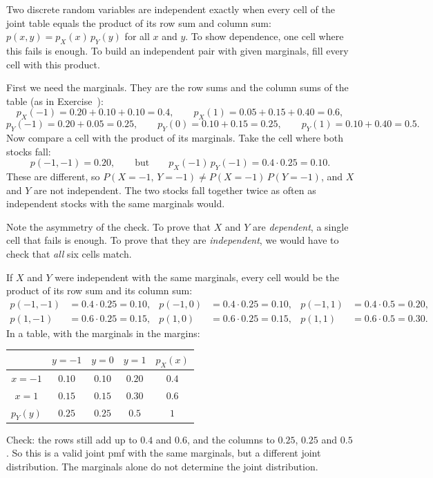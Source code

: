 \begin{solution}
	\idea Two discrete random variables are independent exactly when every
	cell of the joint table equals the product of its row sum and column sum:
	$p(x,y)=p_X(x)\,p_Y(y)$ for all $x$ and $y$. To show dependence, one cell
	where this fails is enough. To build an independent pair with given
	marginals, fill every cell with this product.

	 First we need the marginals. They are the row sums and the
	column sums of the table (as in Exercise~):
	\[ p_X(-1)=0.20+0.10+0.10=0.4,\qquad p_X(1)=0.05+0.15+0.40=0.6, \]
	\[ p_Y(-1)=0.20+0.05=0.25,\qquad p_Y(0)=0.10+0.15=0.25,\qquad
		p_Y(1)=0.10+0.40=0.5. \]
	Now compare a cell with the product of its marginals. Take the cell where
	both stocks fall:
	\[ p(-1,-1)=0.20,\qquad\text{but}\qquad
		p_X(-1)\,p_Y(-1)=0.4\cdot0.25=0.10. \]
	These are different, so $P(X=-1,\,Y=-1)\neq P(X=-1)\,P(Y=-1)$, and $X$
	and $Y$ are not independent. The two stocks fall together twice as often
	as independent stocks with the same marginals would.

	Note the asymmetry of the check. To prove that $X$ and $Y$ are
	\emph{dependent}, a single cell that fails is enough. To prove that they
	are \emph{independent}, we would have to check that \emph{all} six cells
	match.

	 If $X$ and $Y$ were independent with the same marginals, every
	cell would be the product of its row sum and its column sum:
	\[ \begin{aligned}
		p(-1,-1)&=0.4\cdot0.25=0.10, & p(-1,0)&=0.4\cdot0.25=0.10, &
		p(-1,1)&=0.4\cdot0.5=0.20,\\
		p(1,-1)&=0.6\cdot0.25=0.15, & p(1,0)&=0.6\cdot0.25=0.15, &
		p(1,1)&=0.6\cdot0.5=0.30.
	\end{aligned} \]
	In a table, with the marginals in the margins:
	\begin{center}
		\renewcommand{\arraystretch}{1.25}
		\begin{tabular}{c|ccc|c}
			         & $y=-1$ & $y=0$  & $y=1$  & $p_X(x)$ \\
			\hline
			$x=-1$   & $0.10$ & $0.10$ & $0.20$ & $0.4$ \\
			$x=1$    & $0.15$ & $0.15$ & $0.30$ & $0.6$ \\
			\hline
			$p_Y(y)$ & $0.25$ & $0.25$ & $0.5$  & $1$
		\end{tabular}
	\end{center}
	Check: the rows still add up to $0.4$ and $0.6$, and the columns to
	$0.25$, $0.25$ and $0.5$. So this is a valid joint pmf with the same
	marginals, but a different joint distribution. The marginals alone do not
	determine the joint distribution.


\end{solution}
